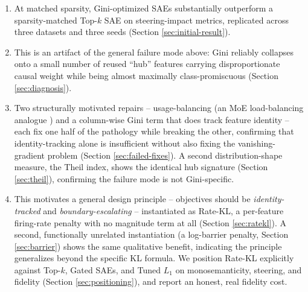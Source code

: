 \documentclass[11pt,twocolumn]{article}
\begin{document}
\begin{enumerate}
\item At matched sparsity, Gini-optimized SAEs substantially outperform a sparsity-matched Top-$k$ SAE on steering-impact metrics, replicated across three datasets and three seeds (Section \ref{sec:initial-result}).
\item This is an artifact of the general failure mode above: Gini reliably collapses onto a small number of reused ``hub'' features carrying disproportionate causal weight while being almost maximally class-promiscuous (Section \ref{sec:diagnosis}).
\item Two structurally motivated repairs -- usage-balancing (an MoE load-balancing analogue \citep{shazeer2017outrageously, fedus2022switch}) and a column-wise Gini term that does track feature identity -- each fix one half of the pathology while breaking the other, confirming that identity-tracking alone is insufficient without also fixing the vanishing-gradient problem (Section \ref{sec:failed-fixes}). A second distribution-shape measure, the Theil index, shows the identical hub signature (Section \ref{sec:theil}), confirming the failure mode is not Gini-specific.
\item This motivates a general design principle -- objectives should be \emph{identity-tracked} and \emph{boundary-escalating} -- instantiated as Rate-KL, a per-feature firing-rate penalty with no magnitude term at all (Section \ref{sec:ratekl}). A second, functionally unrelated instantiation (a log-barrier penalty, Section \ref{sec:barrier}) shows the same qualitative benefit, indicating the principle generalizes beyond the specific KL formula. We position Rate-KL explicitly against Top-$k$, Gated SAEs, and Tuned $L_1$ on monosemanticity, steering, and fidelity (Section \ref{sec:positioning}), and report an honest, real fidelity cost.
\end{enumerate}
\end{document}
